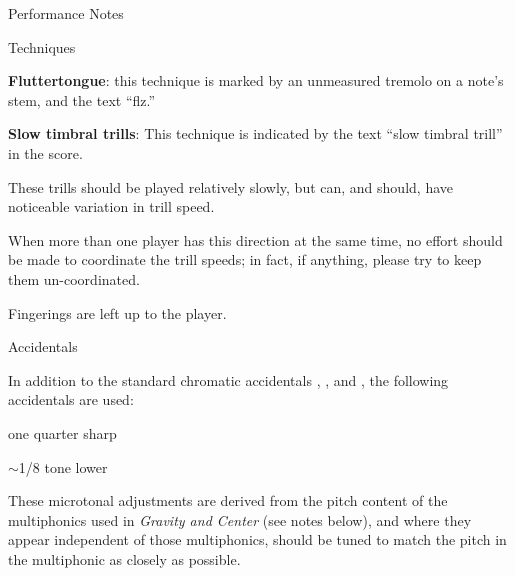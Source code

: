 \documentclass{article}
\begin{document}
\begin{center}
  {\Huge Performance Notes}
\end{center}

\vspace{2em}


{\Large Techniques}

\textbf{Fluttertongue}: this technique is marked by an unmeasured tremolo on a note's stem, and the text ``flz.''
%
\ifx\preLilyPondExample \undefined
\else
  \expandafter\preLilyPondExample
\fi
\raisebox{-0.3\height}{}%
\ifx\postLilyPondExample \undefined
\else
  \expandafter\postLilyPondExample
\fi
{}

\vspace{1em}

\textbf{Slow timbral trills}:
This technique is indicated by the text ``slow timbral trill'' in the score.
%
\ifx\preLilyPondExample \undefined
\else
  \expandafter\preLilyPondExample
\fi
\raisebox{-0.3\height}{}%
\ifx\postLilyPondExample \undefined
\else
  \expandafter\postLilyPondExample
\fi
{}

These trills should be played relatively slowly, but can, and should, have noticeable
variation in trill speed.

When more than one player has this direction at the same time, no effort should
be made to coordinate the trill speeds; in fact, if anything, please try to keep them un-coordinated.

Fingerings are left up to the player.

\vspace{2em}

{\large Accidentals}

In addition to the standard chromatic accidentals \hspace{.2em} \flat, \sharp, and \natural, the following accidentals are used:

 \hspace{.2em} one quarter sharp

 \hspace{.5em}
 \hspace{.5em} $\sim$1/8 tone lower

These microtonal adjustments are derived from the pitch content of the multiphonics used in \textit{Gravity and Center} (see notes below), and where they appear independent of those multiphonics, should be tuned to
match the pitch in the multiphonic as closely as possible.
\end{document}
